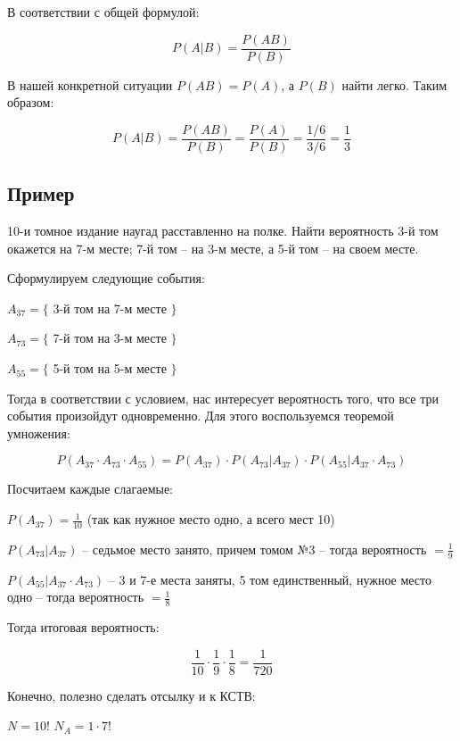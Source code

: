 \documentclass{article}
\begin{document}
В соответствии с общей формулой:

$$P(A|B) = \frac{P(AB)}{P(B)}$$

В нашей конкретной ситуации $P(AB) = P(A)$, а $P(B)$ найти легко. Таким образом:

$$P(A|B) = \frac{P(AB)}{P(B)} = \frac{P(A)}{P(B)} = \frac{1 / 6}{3 / 6} = \frac{1}{3}$$ 

\subsection{Пример}

10-и томное издание наугад расставленно на полке. Найти вероятность 3-й том окажется на 7-м месте; 7-й том -- на 3-м месте, а 5-й том -- на своем месте.

\quad

Сформулируем следующие события:

$A_{37} = \{$ 3-й том на 7-м месте $\}$

$A_{73} = \{$ 7-й том на 3-м месте $\}$

$A_{55} = \{$ 5-й том на 5-м месте $\}$

\quad

Тогда в соответствии с условием, нас интересует вероятность того, что все три события произойдут одновременно. Для этого воспользуемся теоремой умножения:

$$ P(A_{37} \cdot A_{73} \cdot A_{55}) = P(A_{37}) \cdot P(A_{73} | A_{37}) \cdot P(A_{55} | A_{37}\cdot A_{73}) $$

Посчитаем каждые слагаемые:

$P(A_{37}) = \frac{1}{10}$ (так как нужное место одно, а всего мест 10)

$P(A_{73} | A_{37}) $ -- седьмое место занято, причем томом №3 -- тогда вероятность $ = \frac{1}{9}$

$P(A_{55} | A_{37}\cdot A_{73}) $ -- 3 и 7-е места заняты, 5 том единственный, нужное место одно -- тогда вероятность $ = \frac{1}{8} $

Тогда итоговая вероятность:

$$\frac{1}{10} \cdot \frac{1}{9} \cdot \frac{1}{8} = \frac{1}{720} $$

\quad

\quad

Конечно, полезно сделать отсылку и к КСТВ:

\quad

$N = 10!$ \qquad\qquad\qquad $N_A = 1 \cdot 7!$

\quad
\end{document}
